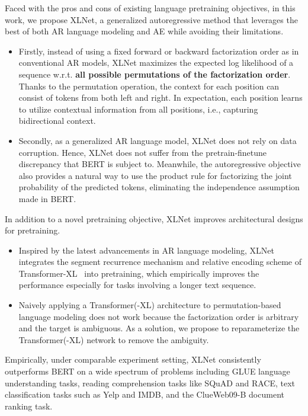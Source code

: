 Faced with the pros and cons of existing language pretraining objectives, in this work, we propose XLNet, a generalized autoregressive method that leverages the best of both AR language modeling and AE while avoiding their limitations.
\begin{itemize}[leftmargin=*,topsep=0em,itemsep=0em,parsep=0.2em]
\item Firstly, instead of using a fixed forward or backward factorization order as in conventional AR models, XLNet maximizes the expected log likelihood of a sequence w.r.t. \textbf{all possible permutations of the factorization order}.
Thanks to the permutation operation, the context for each position can consist of tokens from both left and right.
In expectation, each position learns to utilize contextual information from all positions, i.e., capturing bidirectional context.

\item Secondly, as a generalized AR language model, XLNet does not rely on data corruption. 
Hence, XLNet does not suffer from the pretrain-finetune discrepancy that BERT is subject to.
Meanwhile, the autoregressive objective also provides a natural way to use the product rule for factorizing the joint probability of the predicted tokens, eliminating the independence assumption made in BERT.
\end{itemize}

In addition to a novel pretraining objective, XLNet improves architectural designs for pretraining.
\begin{itemize}[leftmargin=*,topsep=0em,itemsep=0em,parsep=0.2em]
\item Inspired by the latest advancements in AR language modeling, XLNet integrates the segment recurrence mechanism and relative encoding scheme of Transformer-XL~\cite{dai2019transformer} into pretraining, which empirically improves the performance especially for tasks involving a longer text sequence.
\item Naively applying a Transformer(-XL) architecture to permutation-based language modeling does not work because the factorization order is arbitrary and the target is ambiguous. As a solution, we propose to reparameterize the Transformer(-XL) network to remove the ambiguity.
\end{itemize}


Empirically, under comparable experiment setting, XLNet consistently outperforms BERT \cite{devlin2018bert} on a wide spectrum of problems including GLUE language understanding tasks, reading comprehension tasks like SQuAD and RACE, text classification tasks such as Yelp and IMDB, and the ClueWeb09-B document ranking task.


